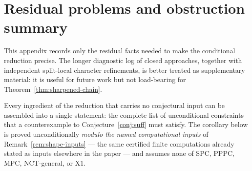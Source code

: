 \documentclass[11pt]{amsart}
\theoremstyle{plain}
\theoremstyle{definition}
\theoremstyle{remark}
\numberwithin{equation}{section}
\begin{document}
\appendix

\section{Residual problems and obstruction summary}\label{sec:residual-appendix}

This appendix records only the residual facts needed to make the conditional reduction precise. The longer diagnostic log of closed approaches, together with independent split-local character refinements, is better treated as supplementary material: it is useful for future work but not load-bearing for Theorem~\ref{thm:sharpened-chain}.

Every ingredient of the reduction that carries no conjectural input can be
assembled into a single statement: the complete list of unconditional
constraints that a counterexample to Conjecture~\ref{conj:suff} must
satisfy. The corollary below is proved unconditionally \emph{modulo the
named computational inputs} of Remark~\ref{rem:shape-inputs} --- the same
certified finite computations already stated as inputs elsewhere in the
paper --- and assumes none of SPC, PPPC, MPC, NCT-general, or X1.
\end{document}
